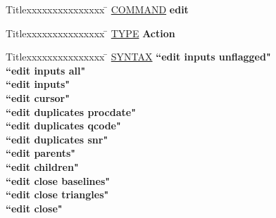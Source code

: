 \begin{tabbing}
Titlexxxxxxxxxxxxxxx \= \kill
\underline{COMMAND} \> {\bf 	edit} \\
\end{tabbing}

\begin{tabbing}
Titlexxxxxxxxxxxxxxx \= \kill
\underline{TYPE} \> {\bf 		Action} \\
\end{tabbing}

\begin{tabbing}
Titlexxxxxxxxxxxxxxx \= \kill
\underline{SYNTAX} \> {\bf 		``edit inputs unflagged"} \\
\> {\bf 		``edit inputs all"} \\
\> {\bf 		``edit inputs"} \\
\> {\bf 		``edit cursor"} \\
\> {\bf 		``edit duplicates procdate"} \\
\> {\bf 		``edit duplicates qcode"} \\
\> {\bf 		``edit duplicates snr"} \\
\> {\bf 		``edit parents"} \\
\> {\bf 		``edit children"} \\
\> {\bf 		``edit close baselines"} \\
\> {\bf 		``edit close triangles"} \\
\> {\bf 		``edit close"} \\
\end{tabbing}

